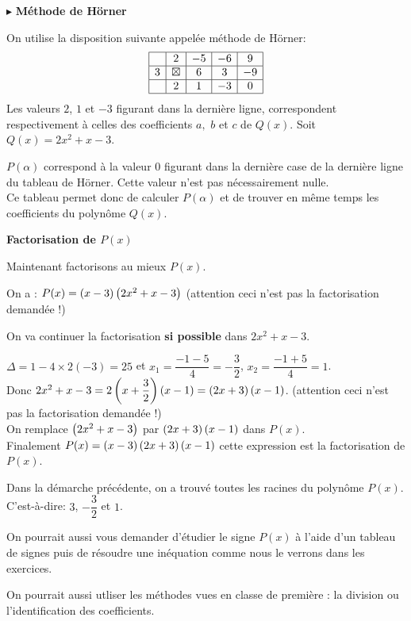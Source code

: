 $ \blacktriangleright $ \textbf{ Méthode de   Hörner}
 

On utilise la disposition suivante appelée méthode de Hörner:
\renewcommand{\arraystretch}{1.3}
\[\begin{array}{|c|c|c|c|c|}
\hline   & 2 & -5 &  -6 &  9  \\
\hline
3  & \boxtimes   & 6 & 3 & -9   \\
\hline
 & 2 & 1 & -3 & 0 \\
\hline
\end{array}\]
Les valeurs $ 2 $, $ 1 $ et $ -3 $ figurant dans la dernière ligne, correspondent respectivement à celles des coefficients   $a ,$ $ b $ et  $c $ de \; $ Q(x). $  Soit \; $ Q(x)=2x^{2}+x-3 $.

$ P(\alpha) $  correspond à la valeur  $ 0 $ figurant dans la dernière case de la dernière ligne du tableau de Hörner. Cette valeur n'est pas nécessairement nulle.\\ Ce tableau permet donc de calculer $ P(\alpha) $ et de trouver en même temps les coefficients du polynôme 
$ Q(x). $ 
\bigskip

\textbf{Factorisation de $ P(x) $ }

Maintenant factorisons au mieux $ P(x) $.

On a : $  P(x)=\left(x-3\right)\left(2x^{2}+x-3\right) $ \; (attention ceci n'est pas la factorisation demandée  !)

On va  continuer la factorisation  \textbf{si possible} dans\; $2x^{2}+x-3$.

$ \Delta=1-4\times2(-3)=25 $\; et $ x_{1}=\dfrac{-1-5}{4}=-\dfrac{3}{2} $,\; $ x_{2}=\dfrac{-1+5}{4}=1 $.\\Donc \;$2x^{2}+x-3=2\left(x+\dfrac{3}{2}\right)\left(x-1\right)=\left(2x+3\right)\left(x-1\right)$. \; (attention ceci n'est pas la factorisation demandée  !)\\

On remplace $ \left(2x^{2}+x-3\right) $  par $ \left(2x+3\right)\left(x-1\right) $ dans $  P(x) $.\\
Finalement \; $ P(x)=\left(x-3\right)\left(2x+3\right)\left(x-1\right) $\; cette expression est la factorisation de $ P(x) $.

\bigskip

\begin{remark}
 Dans la démarche précédente, on a trouvé  toutes les racines du polynôme $ P(x) $.  C'est-à-dire:\; $ 3$,  $ -\dfrac{3}{2} $ et $1 $.
 
On pourrait aussi vous demander  d'étudier le signe  $ P(x) $ à l'aide d'un tableau de signes puis de résoudre une inéquation comme nous le verrons dans les exercices.
\end{remark}

\begin{remark}

 On pourrait aussi utliser les méthodes vues en classe de première : la division ou l'identification des coefficients.
\end{remark}
 

